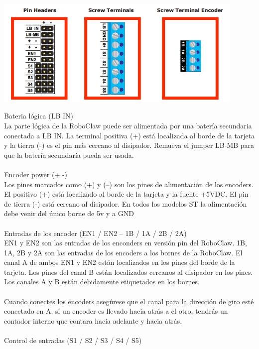 \documentclass[user_manual.tex]{subfiles}
\begin{document}
\begin{center}
\includegraphics[width=0.9\textwidth]{Figures/Hardware/Partes/Pines.png}
\label{fig:Hardware:Partes:Pines}
\end{center}

Bateria lógica (LB IN)\\
La parte lógica de la RoboClaw puede ser alimentada por una batería secundaria conectada a LB IN. La terminal positiva
(+) está localizada al borde de la tarjeta y la tierra (-) es el pin más cercano al disipador. Remueva el jumper LB-MB
para que la batería secundaría pueda ser usada.\\
\\
Encoder power (+ -)\\
Los pines marcados como (+) y (–) son los pines de alimentación  de los encoders. El positivo (+) está localizado al
borde de la tarjeta y la fuente +5VDC. El pin de tierra (-) está cercano al disipador. En todos los modelos ST la
alimentación debe venir del único borne de 5v  y a GND\\
\\
Entradas de los encoder (EN1 / EN2 – 1B / 1A / 2B / 2A)\\ 
EN1 y EN2 son las entradas de los enconders en versión pin del RoboClaw. 1B, 1A, 2B y 2A son las entradas de los encoders
a los bornes de la RoboClaw. El canal A de ambos EN1 y EN2 están localizados en los pines del borde de la tarjeta.
Los pines del canal B están localizados cercanos al disipador en los pines. Los canales A y B están debidamente etiquetados
en los bornes.\\
\\
Cuando conectes los encoders asegúrese que el canal para la dirección de giro esté conectado en A. si un encoder es
llevado hacia atrás a el otro, tendrás un contador interno que contara hacía adelante y hacia atrás. \\
\\
Control de entradas (S1 / S2 / S3 / S4 / S5)\\
\end{document}
